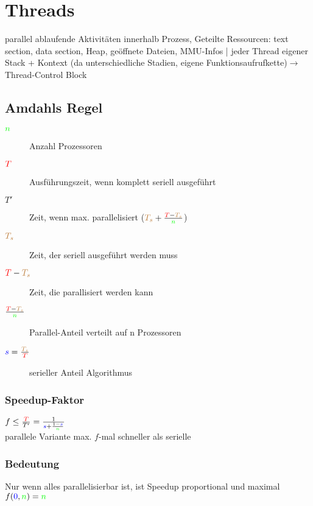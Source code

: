 \section{Threads}
parallel ablaufende Aktivitäten innerhalb Prozess, Geteilte Ressourcen: text section, data section, Heap, geöffnete Dateien, MMU-Infos | jeder Thread eigener Stack + Kontext (da unterschiedliche Stadien, eigene Funktionsaufrufkette)$\rightarrow$Thread-Control Block

\subsection{Amdahls Regel}
\begin{description}
\item[$\textcolor{green}{n}$]Anzahl Prozessoren
\item[$\textcolor{red}{T}$]Ausführungszeit, wenn komplett seriell ausgeführt
\item[$T'$]Zeit, wenn max. parallelisiert ($\textcolor{brown}{\textcolor{brown}{T_{s}}} + \frac{\textcolor{red}{T}-\textcolor{brown}{\textcolor{brown}{\textcolor{brown}{T_{s}}}}}{\textcolor{green}{n}}$)
\item[$\textcolor{brown}{\textcolor{brown}{\textcolor{brown}{T_{s}}}}$]Zeit, der seriell ausgeführt werden muss
\item[$\textcolor{red}{T} - \textcolor{brown}{\textcolor{brown}{\textcolor{brown}{T_{s}}}}$]Zeit, die parallisiert werden kann
\item[$\frac{\textcolor{red}{T} - \textcolor{brown}{\textcolor{brown}{\textcolor{brown}{T_{s}}}}}{\textcolor{green}{n}}$]Parallel-Anteil verteilt auf n Prozessoren
\item[$\textcolor{blue}{s} = \frac{\textcolor{brown}{T_s}}{\textcolor{red}{T}}$]serieller Anteil Algorithmus
\end{description}

\subsubsection{Speedup-Faktor}
$f \le \frac{\textcolor{red}{T}}{T'} = \frac{1}{\textcolor{blue}{s} + \frac{1-\textcolor{blue}{s}}{\textcolor{green}{n}}}$\\
parallele Variante max. $f$-mal schneller als serielle

\subsubsection{Bedeutung}
Nur wenn alles parallelisierbar ist, ist Speedup proportional und maximal $f(\textcolor{blue}{0},\textcolor{green}{n}) = \textcolor{green}{n}$

